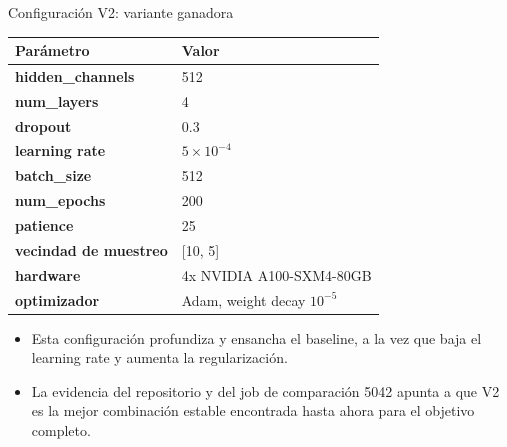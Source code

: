 \begin{frame}{Configuraci\'on V2: variante ganadora}
  \small
  \begin{tabularx}{\textwidth}{>{\bfseries}p{3.2cm}X}
    \toprule
    Par\'ametro & Valor \\
    \midrule
    hidden\_channels & 512 \\
    num\_layers & 4 \\
    dropout & 0.3 \\
    learning rate & $5 \times 10^{-4}$ \\
    batch\_size & 512 \\
    num\_epochs & 200 \\
    patience & 25 \\
    vecindad de muestreo & [10, 5] \\
    hardware & 4x NVIDIA A100-SXM4-80GB \\
    optimizador & Adam, weight decay $10^{-5}$ \\
    \bottomrule
  \end{tabularx}

  \vspace{0.5em}
  \begin{itemize}
    \item Esta configuraci\'on profundiza y ensancha el baseline, a la vez que baja el learning rate y aumenta la regularizaci\'on.
    \item La evidencia del repositorio y del job de comparaci\'on 5042 apunta a que V2 es la mejor combinaci\'on estable encontrada hasta ahora para el objetivo completo.
  \end{itemize}
\end{frame}

